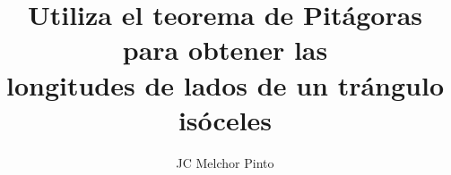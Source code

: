 \documentclass[12pt,addpoints,answers]{guia}
\title{Utiliza el teorema de Pitágoras para obtener las \\longitudes de lados de un trángulo isóceles}
\author{JC Melchor Pinto}
\begin{document}
\pagestyle{headandfoot}
\INFO%
\begin{multicols}{2}
    
    
    
    \columnbreak
\end{multicols}%
\begin{questions}
    \questionboxed[10]{}
    \questionboxed[10]{}
    \questionboxed[10]{}
    \questionboxed[10]{}
    \questionboxed[10]{}
    \questionboxed[10]{}
    \questionboxed[10]{}
    \questionboxed[10]{}
    \questionboxed[10]{}
    \questionboxed[10]{}
    \questionboxed[10]{}
    \questionboxed[10]{}
    \questionboxed[10]{}
    \questionboxed[10]{}
\end{questions}
\end{document}
